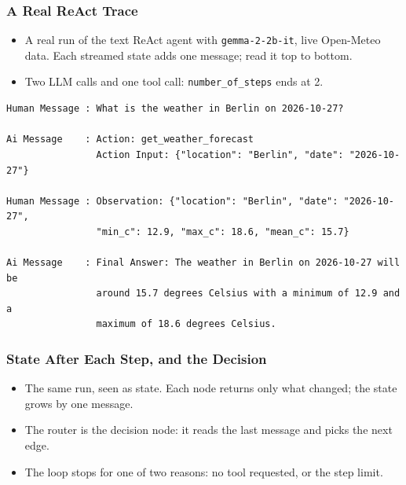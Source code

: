 \begin{frame}[fragile]\frametitle{A Real ReAct Trace}
      \begin{itemize}
        \item A real run of the text ReAct agent with \texttt{gemma-2-2b-it}, live Open-Meteo data. Each streamed state adds one message; read it top to bottom.
        \item Two LLM calls and one tool call: \texttt{number\_of\_steps} ends at 2.
      \end{itemize}
\begin{lstlisting}[basicstyle=\tiny\ttfamily]
Human Message : What is the weather in Berlin on 2026-10-27?

Ai Message    : Action: get_weather_forecast
                Action Input: {"location": "Berlin", "date": "2026-10-27"}

Human Message : Observation: {"location": "Berlin", "date": "2026-10-27",
                "min_c": 12.9, "max_c": 18.6, "mean_c": 15.7}

Ai Message    : Final Answer: The weather in Berlin on 2026-10-27 will be
                around 15.7 degrees Celsius with a minimum of 12.9 and a
                maximum of 18.6 degrees Celsius.
\end{lstlisting}
\end{frame}

\begin{frame}[fragile]\frametitle{State After Each Step, and the Decision}
\begin{itemize}
\item The same run, seen as state. Each node returns only what changed; the state grows by one message.
\item The router is the decision node: it reads the last message and picks the next edge.
\end{itemize}
\begin{center}
\small
{}
\end{center}
\begin{itemize}
\item The loop stops for one of two reasons: no tool requested, or the step limit.
\end{itemize}
\end{frame}

